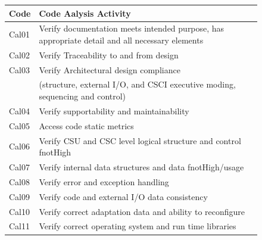 \documentclass[twocolumn]{styles/IEEEtran}
\begin{document}
\begin{figure}[h]
\begin{tiny}
\begin{center}
\begin{tabular}[t]{|l@{ }|l@{ }|}
Code 	& Code Aalysis Activity	\\  \hline
Cal01	&Verify documentation meets intended purpose, has appropriate detail and all necessary elements \\
Cal02	&Verify Traceability to and from design \\
Cal03	&Verify Architectural design compliance  \\
	& (structure, external I/O, and CSCI executive moding, sequencing and control) \\
Cal04	&Verify supportability and maintainability \\
Cal05	&Access code static metrics \\
Cal06	&Verify CSU and CSC level logical structure and control fnotHigh \\
Cal07	&Verify internal data structures and data fnotHigh/usage \\
Cal08	&Verify error and exception handling \\
Cal09	&Verify code and external I/O data consistency \\
Cal10	&Verify correct adaptation data and ability to reconfigure \\
Cal11	&Verify correct operating system and run time libraries \\ \hline


\end{tabular}
\end{center}
\end{tiny}
\end{figure}
\end{document}
